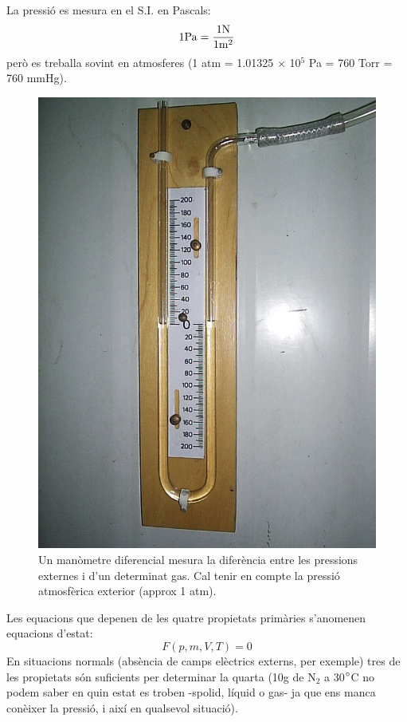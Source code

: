 La pressió es mesura en el S.I. en Pascals:
\[
1 {\rm Pa}=\frac{1 {\rm N}}{1 {\rm m}^2}
\]
però es treballa sovint en atmosferes (1 atm = 1.01325 $\times$ 10$^5$ Pa = 760 Torr = 760 mmHg).
\begin{figure}[h]
\centering
\includegraphics[scale=0.33]{figures/Manometre.png}
\caption[Manòmetre diferencial]{Un manòmetre diferencial mesura la diferència entre les pressions externes i d'un determinat gas. Cal tenir en compte la pressió atmosfèrica exterior (approx 1 atm).}
\label{fig:Manometre}
\end{figure}
Les equacions que depenen de les quatre propietats primàries s'anomenen equacions d'estat:
\[F(p,m,V,T)=0\]
En situacions normals (absència de camps elèctrics externs, per exemple) tres de les propietats són suficients per determinar la quarta (10g de N$_2$ a 30$\degree$C no podem saber en quin estat es troben -spolid, líquid o gas- ja que ens manca conèixer la pressió, i així en qualsevol situació).

